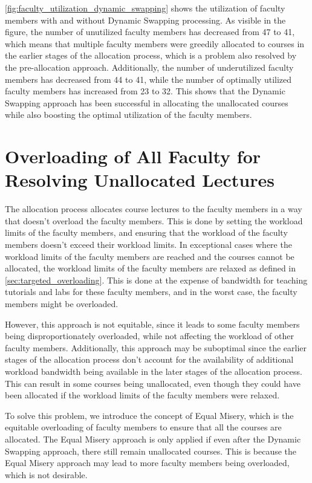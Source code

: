 \autoref{fig:faculty_utilization_dynamic_swapping} shows the utilization of faculty members with and without Dynamic Swapping processing. As visible in the figure, the number of unutilized faculty members has decreased from 47 to 41, which means that multiple faculty members were greedily allocated to courses in the earlier stages of the allocation process, which is a problem also resolved by the pre-allocation approach. Additionally, the number of underutilized faculty members has decreased from 44 to 41, while the number of optimally utilized faculty members has increased from 23 to 32. This shows that the Dynamic Swapping approach has been successful in allocating the unallocated courses while also boosting the optimal utilization of the faculty members.


\section{Overloading of All Faculty for Resolving Unallocated Lectures}
\label{sec:equal_misery}

The allocation process allocates course lectures to the faculty members in a way that doesn't overload the faculty members. This is done by setting the workload limits of the faculty members, and ensuring that the workload of the faculty members doesn't exceed their workload limits. In exceptional cases where the workload limits of the faculty members are reached and the courses cannot be allocated, the workload limits of the faculty members are relaxed as defined in \autoref{sec:targeted_overloading}. This is done at the expense of bandwidth for teaching tutorials and labs for these faculty members, and in the worst case, the faculty members might be overloaded.

However, this approach is not equitable, since it leads to some faculty members being disproportionately overloaded, while not affecting the workload of other faculty members. Additionally, this approach may be suboptimal since the earlier stages of the allocation process don't account for the availability of additional workload bandwidth being available in the later stages of the allocation process. This can result in some courses being unallocated, even though they could have been allocated if the workload limits of the faculty members were relaxed.

To solve this problem, we introduce the concept of Equal Misery, which is the equitable overloading of faculty members to ensure that all the courses are allocated. The Equal Misery approach is only applied if even after the Dynamic Swapping approach, there still remain unallocated courses. This is because the Equal Misery approach may lead to more faculty members being overloaded, which is not desirable.


